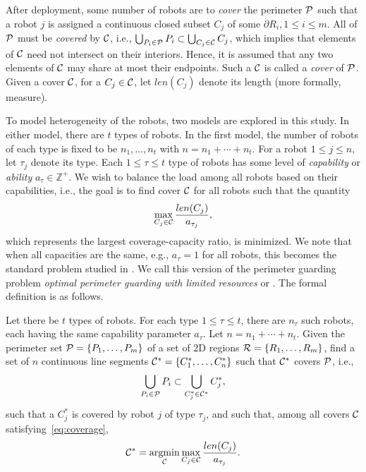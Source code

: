 After deployment, some number of robots are to {\em cover} the perimeter 
$\P$ such that a robot $j$ is assigned a continuous closed subset $C_j$ 
of some $\partial R_i, 1 \le i \le m$. All of $\P$ must be {\em covered} 
by $\C$, i.e., 
%
$\bigcup_{P_i \in \P} P_i  \subset \bigcup_{C_j \in \C} C_j$,
%
which implies that elements of $\C$ need not intersect on their interiors. 
Hence, it is assumed that any two elements of $\C$ may share at most their 
endpoints. Such a $\C$ is called a {\em cover} of $\P$. Given a cover 
$\C$, for a $C_j \in \C$, let $len(C_j)$ denote its length (more formally, 
measure). 

To model heterogeneity of the robots, two models are explored in this
study. In either model, there are $t$ types of robots. In the first model,
the number of robots of each type is fixed to be $n_1, \ldots, n_t$ with 
$n = n_1 + \cdots + n_t$. For a robot $1 \le j \le n$, let $\tau_j$ denote 
its type. Each $1 \le \tau \le t$ type of robots has some 
level of {\em capability} or {\em ability} $a_{\tau} \in \mathbb Z^+$. We 
wish to balance the load among all robots based on their capabilities, 
i.e., the goal is to find cover $\C$ for all robots such that the quantity 
\[
\max_{C_j \in \C} \frac{len(C_j)}{a_{\tau_j}},
\]
which represents the largest coverage-capacity ratio, is minimized. 
We note that when all capacities are the same, e.g., $a_{\tau} = 1$ for 
all robots, this becomes the standard \opg problem studied in \cite{FenHanGaoYu19RSS}. 
We call this version of the perimeter guarding problem {\em optimal 
	perimeter guarding with limited resources} or \opglr. The formal 
definition is as follows.

\begin{problem} Let there be $t$ types of robots. For each type $1\le \tau 
	\le t$, there are $n_{\tau}$ such robots, each having the same 
	capability parameter $a_{\tau}$. Let $n = n_1 + \cdots + n_t$. 
	Given the perimeter set $\P = \{P_1, \ldots, P_m\}$ of a set of 
	2D regions $\R =\{R_1, \ldots, R_m\}$, find a set of $n$ continuous 
	line segments $\C^* = \{C_1^*, \ldots, C_n^*\}$ such that $\C^*$ covers 
	$\P$, i.e., \begin{align}\label{eq:coverage}
	\bigcup_{P_i \in \P} P_i  \subset \bigcup_{C_j^* \in \C^*} C_j^*,
	\end{align}
	such that a $C_j^*$ is covered by robot $j$ of type $\tau_j$, and such that,
	among all covers $\C$ satisfying~\eqref{eq:coverage}, 
	\begin{align}\label{eq:objective}
	\C^* = \underset{\C}{\mathrm{argmin}} \max_{C_j \in \C} 
	\frac{len(C_j)}{a_{\tau_j}}.
	\end{align}
\end{problem}


